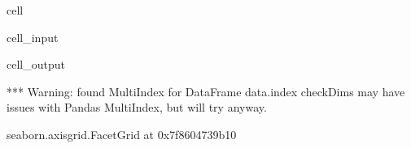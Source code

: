 \documentclass[letterpaper,table,10pt,english]{jupyterBook}
\begin{document}
\begin{sphinxuseclass}{cell}\begin{sphinxVerbatimInput}

\begin{sphinxuseclass}{cell_input}
\begin{sphinxVerbatim}[commandchars=\\\{\}]
  
     
                 
                     
\end{sphinxVerbatim}

\end{sphinxuseclass}\end{sphinxVerbatimInput}
\begin{sphinxVerbatimOutput}

\begin{sphinxuseclass}{cell_output}
\begin{sphinxVerbatim}[commandchars=\\\{\}]
*** Warning: found MultiIndex for DataFrame data.index \PYGZhy{} checkDims may have issues with Pandas MultiIndex, but will try anyway.
\end{sphinxVerbatim}

\begin{sphinxVerbatim}[commandchars=\\\{\}]
\PYGZlt{}seaborn.axisgrid.FacetGrid at 0x7f8604739b10\PYGZgt{}
\end{sphinxVerbatim}

\noindent{}

\end{sphinxuseclass}\end{sphinxVerbatimOutput}

\end{sphinxuseclass}
\end{document}
